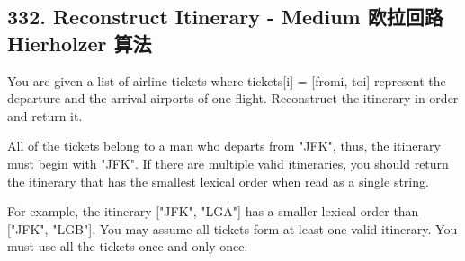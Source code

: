 \documentclass[9pt, b5paaper]{book}
\begin{document}
\subsection{332. Reconstruct Itinerary - Medium 欧拉回路 Hierholzer 算法}
\label{sec-1-5-2}
You are given a list of airline tickets where tickets[i] = [fromi, toi] represent the departure and the arrival airports of one flight. Reconstruct the itinerary in order and return it.

All of the tickets belong to a man who departs from "JFK", thus, the itinerary must begin with "JFK". If there are multiple valid itineraries, you should return the itinerary that has the smallest lexical order when read as a single string.

For example, the itinerary ["JFK", "LGA"] has a smaller lexical order than ["JFK", "LGB"].
You may assume all tickets form at least one valid itinerary. You must use all the tickets once and only once.
\end{document}
